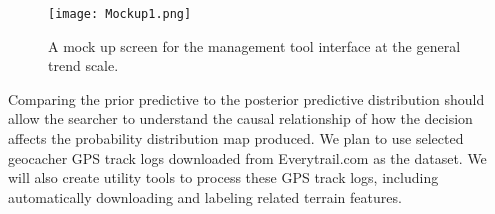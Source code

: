 \begin{itemize}
\begin{figure}
\centering
\texttt{[image: Mockup1.png]}
\caption{A mock up screen for the management tool interface at the general trend scale.}
\label{Mockup1}
\end{figure}

Comparing the prior predictive to the posterior predictive distribution should allow the searcher to understand the causal relationship of how the decision affects the probability distribution map produced. We plan to use selected geocacher GPS track logs downloaded from Everytrail.com as the dataset. We will also create utility tools to process these GPS track logs, including automatically downloading and labeling related terrain features.






\end{itemize}
